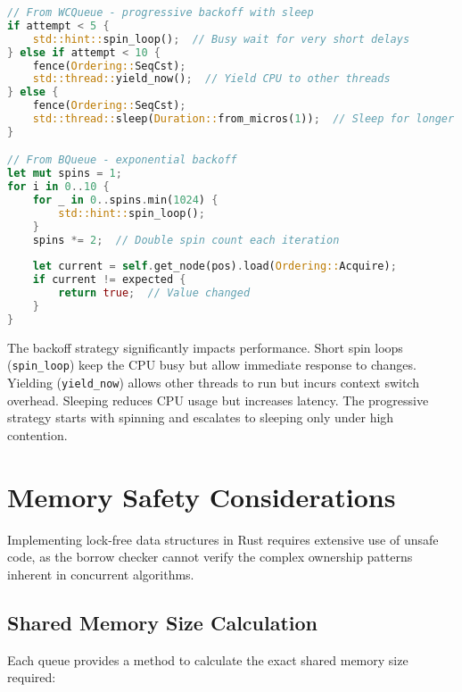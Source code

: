 \begin{lstlisting}[language=Rust, style=boxed, caption={Adaptive backoff strategies}, label={lst:adaptive-backoff}]
// From WCQueue - progressive backoff with sleep
if attempt < 5 {
    std::hint::spin_loop();  // Busy wait for very short delays
} else if attempt < 10 {
    fence(Ordering::SeqCst);
    std::thread::yield_now();  // Yield CPU to other threads
} else {
    fence(Ordering::SeqCst);
    std::thread::sleep(Duration::from_micros(1));  // Sleep for longer delays
}

// From BQueue - exponential backoff
let mut spins = 1;
for i in 0..10 {
    for _ in 0..spins.min(1024) {
        std::hint::spin_loop();
    }
    spins *= 2;  // Double spin count each iteration
    
    let current = self.get_node(pos).load(Ordering::Acquire);
    if current != expected {
        return true;  // Value changed
    }
}
\end{lstlisting}

The backoff strategy significantly impacts performance. Short spin loops (\texttt{spin\_loop}) keep the CPU busy but allow immediate response to changes. Yielding (\texttt{yield\_now}) allows other threads to run but incurs context switch overhead. Sleeping reduces CPU usage but increases latency. The progressive strategy starts with spinning and escalates to sleeping only under high contention.

\section{Memory Safety Considerations}

Implementing lock-free data structures in Rust requires extensive use of unsafe code, as the borrow checker cannot verify the complex ownership patterns inherent in concurrent algorithms.

\subsection{Shared Memory Size Calculation}

Each queue provides a method to calculate the exact shared memory size required:

